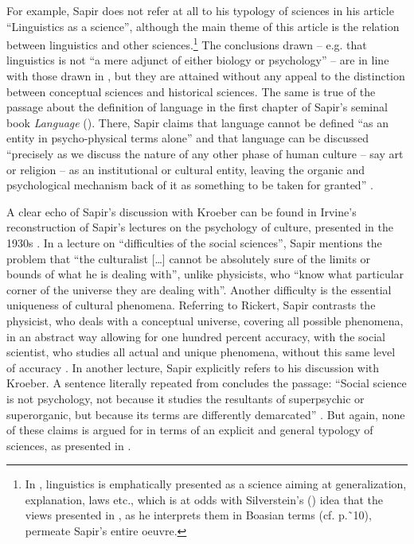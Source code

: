 \documentclass[output=paper]{langscibook}
\begin{document}
For example, Sapir does not refer at all to his typology of sciences in his \citeyear{Sapir1929} article ``Linguistics as a science'', although the main theme of this article is the relation between linguistics and other sciences.\footnote{In \citet{Sapir1929}, linguistics is emphatically presented as a science aiming at generalization, explanation, laws etc., which is at odds with Silverstein’s (\citeyear{Silverstein1986}) idea that the views presented in \citet{Sapir1917}, as he interprets them in Boasian terms (cf. p.˜10), permeate Sapir's entire oeuvre.}  The conclusions drawn – e.g. that linguistics is not ``a mere adjunct of either biology or psychology'' \citep[214]{Sapir1929} – are in line with those drawn in \citeyear{Sapir1917}, but they are attained without any appeal to the distinction between conceptual sciences and historical sciences. The same is true of the passage about the definition of language in the first chapter of Sapir's seminal book \emph{Language} (\citeyear{Sapir1921}). There, Sapir claims that language cannot be defined ``as an entity in psycho-physical terms alone'' and that language can be discussed ``precisely as we discuss the nature of any other phase of human culture – say art or religion – as an institutional or cultural entity, leaving the organic and psychological mechanism back of it as something to be taken for granted'' \citep[10-11]{Sapir1921}.\label{q:elffers:huminst}

A clear echo of Sapir's discussion with Kroeber can be found in Irvine's reconstruction of Sapir's lectures on the psychology of culture, presented in the 1930s \citep{Sapir1994}. In a lecture on ``difficulties of the social sciences'', Sapir mentions the problem that ``the culturalist […] cannot be absolutely sure of the limits or bounds of what he is dealing with'', unlike physicists, who ``know what particular corner of the universe they are dealing with''. Another difficulty is the essential uniqueness of cultural phenomena. Referring to Rickert, Sapir contrasts the physicist, who deals with a conceptual universe, covering all possible phenomena, in an abstract way allowing for one hundred percent accuracy, with the social scientist, who studies all actual and unique phenomena, without this same level of accuracy \citep[56-57]{Sapir1994}. In another lecture, Sapir explicitly refers to his discussion with Kroeber. A sentence literally repeated from \citet[444]{Sapir1917} concludes the passage: ``Social science is not psychology, not because it studies the resultants of superpsychic or superorganic, but because its terms are differently demarcated'' \citep[245]{Sapir1994}. But again, none of these claims is argued for in terms of an explicit and general typology of sciences, as presented in \citet{Sapir1917}.
\end{document}
